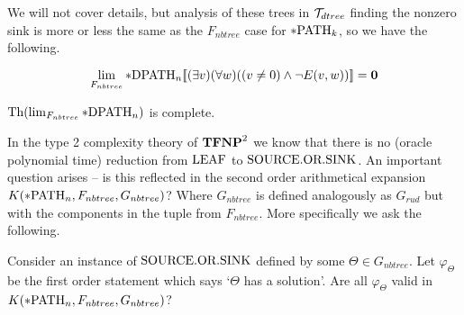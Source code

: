 We will not cover details, but analysis of these trees in $\mathcal{T}_{dtree}$ finding the nonzero sink is more or less the same as the $F_{nbtree}$ case for $*\text{PATH}_k$, so we have the following.

\begin{thrm}
\[\lim_{F_{nbtree}}*\text{DPATH}_n[\![(\exists v)(\forall w)((v\not=0)\land \lnot E(v,w))]\!]=\textbf{0}\]
\end{thrm}

\begin{crll}\label{crllpDPATH}
$\text{Th}(\lim_{F_{nbtree}}*\text{DPATH}_n)$ is complete.
\end{crll}

In the type 2 complexity theory of $\textbf{TFNP}^2$ we know that there is no (oracle polynomial time) reduction from $\text{LEAF}$ to $\text{SOURCE.OR.SINK}$. An important question arises -- is this reflected in the second order arithmetical expansion $K(*\text{PATH}_n,F_{nbtree},G_{nbtree})$? Where $G_{nbtree}$ is defined analogously as $G_{rud}$ but with the components in the tuple from $F_{nbtree}$. More specifically we ask the following.

\begin{ques}
Consider an instance of $\text{SOURCE.OR.SINK}$ defined by some $\Theta\in G_{nbtree}$. Let $\varphi_\Theta$ be the first order statement which says `$\Theta$ has a solution'. Are all $\varphi_\Theta$ valid in $K(*\text{PATH}_n,F_{nbtree},G_{nbtree})$?
\end{ques}
